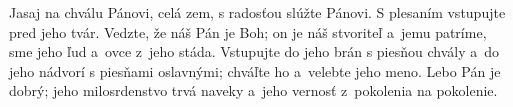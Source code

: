 Jasaj na chválu Pánovi, celá zem,
s radosťou slúžte Pánovi.
\versseparator
S plesaním vstupujte pred jeho tvár.
\versseparator
Vedzte, že náš Pán je Boh;
on je náš stvoriteľ a~jemu patríme,
\versseparator
sme jeho ľud a~ovce z~jeho stáda.
Vstupujte do jeho brán s piesňou chvály
a~do jeho nádvorí s piesňami oslavnými;
\versseparator
chváľte ho a~velebte jeho meno.
Lebo Pán je dobrý;
jeho milosrdenstvo trvá naveky
a~jeho vernosť z~pokolenia na pokolenie.